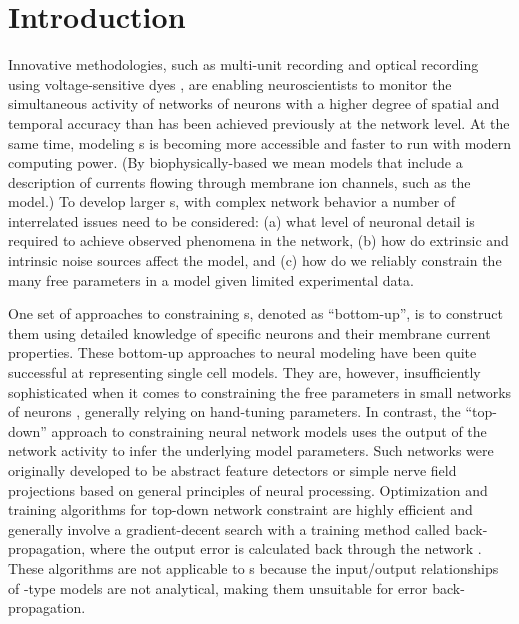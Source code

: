 

\section{Introduction}\label{sec:GA:intro}

Innovative methodologies, such as multi-unit recording
\citep{BrownKassEtAl:2004} and optical recording using
voltage-sensitive dyes
\citep{GrinvaldHildesheim:2004,YangDoiEtAl:2000}, are enabling
neuroscientists to monitor the simultaneous activity of networks of
neurons with a higher degree of spatial and temporal accuracy than has
been achieved previously at the network level. At the same time,
modeling {\BNN}s is becoming more
accessible and faster to run with modern computing power. (By
biophysically-based we mean models that include a description of
currents flowing through membrane ion channels, such as the
{\HH} model.)  To develop larger {\BNN}s, with complex network
behavior a number of interrelated issues need to be considered: (a)
what level of neuronal detail is required to achieve observed
phenomena in the network, (b) how do extrinsic and intrinsic noise
sources affect the model, and (c) how do we reliably constrain the
many free parameters in a model given limited experimental data.

\smallskip{} 

One set of approaches to constraining {\BNN}s, denoted as ``bottom-up'',
is to construct them using detailed knowledge of specific neurons and
their membrane current properties. These bottom-up approaches to
neural modeling have been quite successful at representing single cell
models. They are, however, insufficiently sophisticated when it comes
to constraining the free parameters in small networks of neurons
\citep{GrillnerMarkramEtAl:2005,KochSegev:1998}, generally relying on
hand-tuning parameters. In contrast, the ``top-down'' approach to
constraining neural network models uses the output of the network
activity to infer the underlying model parameters. Such networks were
originally developed to be abstract feature detectors
\citep{Malsberg:1973} or simple nerve field projections
\citep{Amari:1980} based on general principles of neural processing.
Optimization and training algorithms for top-down network constraint
are highly efficient and generally involve a gradient-decent search
with a training method called back-propagation, where the output error
is calculated back through the network
\citep{RumelhartHintonEtAl:1986a}. These algorithms are not applicable
to {\BNN}s because the input/output relationships of {\HH}-type
models are not analytical, making them unsuitable for error
back-propagation.

